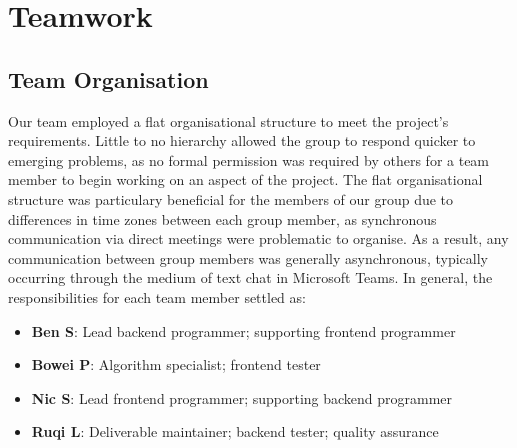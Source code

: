 \documentclass{article}
\begin{document}
\section{Teamwork}
\subsection{Team Organisation}
Our team employed a flat organisational structure to meet the project's
requirements. Little to no hierarchy allowed the group to respond quicker
to emerging problems, as no formal permission was required by others for
a team member to begin working on an aspect of the project. The flat
organisational structure was particulary beneficial for the members of our
group due to differences in time zones between each group member, as
synchronous communication via direct meetings were problematic to organise.
As a result, any communication between group members was generally
asynchronous, typically occurring through the medium of text chat in Microsoft
Teams. In general, the responsibilities for each team member settled as:
\begin{itemize}
\item \textbf{Ben S}: Lead backend programmer; supporting frontend programmer
\item \textbf{Bowei P}: Algorithm specialist; frontend tester
\item \textbf{Nic S}: Lead frontend programmer; supporting backend programmer
\item \textbf{Ruqi L}: Deliverable maintainer; backend tester; quality
assurance
\end{itemize}
\end{document}
